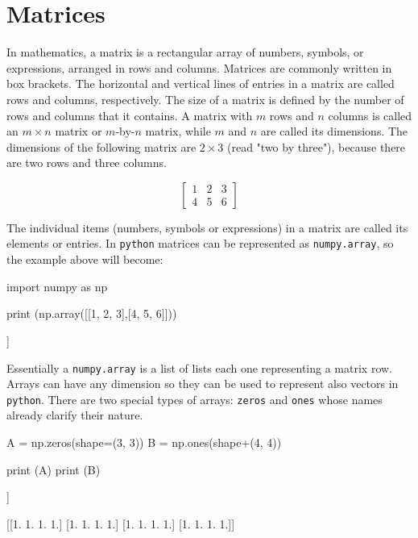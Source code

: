 \chapter{Matrices}
\label{sec:matrices}

In mathematics, a matrix is a rectangular array of numbers, symbols, or expressions, arranged in rows and columns. Matrices are commonly written in box brackets. The horizontal and vertical lines of entries in a matrix are called rows and columns, respectively. The size of a matrix is defined by the number of rows and columns that it contains. A matrix with $m$ rows and $n$ columns is called an $m\times n$ matrix or $m$-by-$n$ matrix, while $m$ and $n$ are called its dimensions. The dimensions of the following matrix are $2\times 3$ (read "two by three"), because there are two rows and three columns.

\begin{equation*}
\begin{bmatrix}
1 & 2 & 3\\
4 & 5 & 6
\end{bmatrix}
\end{equation*}

The individual items (numbers, symbols or expressions) in a matrix are called its elements or entries. 
In \texttt{python} matrices can be represented as \texttt{numpy.array}, so the example above will become:

\begin{ipython}
import numpy as np

print (np.array([[1, 2, 3],[4, 5, 6]]))
\end{ipython}
\begin{ioutput}
[[1 2 3]
 [4 5 6]]
\end{ioutput}

Essentially a \texttt{numpy.array} is a list of lists each one representing a matrix row. Arrays can have any dimension so they can be used to represent also vectors in \texttt{python}. There are two special types of arrays: \texttt{zeros} and \texttt{ones} whose names already clarify their nature.

\begin{ipython}
A = np.zeros(shape=(3, 3))
B = np.ones(shape+(4, 4))

print (A)
print (B)
\end{ipython}
\begin{ioutput}
[[0. 0. 0.]
 [0. 0. 0.]
 [0. 0. 0.]]

[[1. 1. 1. 1.]
 [1. 1. 1. 1.]
 [1. 1. 1. 1.]
 [1. 1. 1. 1.]]
\end{ioutput}

